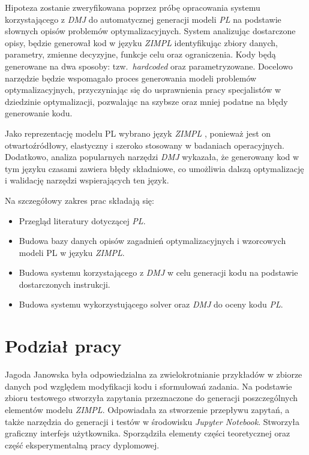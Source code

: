 Hipoteza zostanie zweryfikowana poprzez próbę opracowania systemu korzystającego z \textit{DMJ} do automatycznej generacji modeli \textit{PL} na podstawie słownych opisów problemów optymalizacyjnych. System analizując dostarczone opisy, będzie generował kod w języku \textit{ZIMPL} identyfikując zbiory danych, parametry, zmienne decyzyjne, funkcje celu oraz ograniczenia. Kody będą generowane na dwa sposoby: tzw.~\textit{hardcoded} oraz parametryzowane. Docelowo narzędzie będzie wspomagało proces generowania modeli problemów optymalizacyjnych, przyczyniając się do usprawnienia pracy specjalistów w dziedzinie optymalizacji, pozwalając na szybsze oraz mniej podatne na błędy generowanie kodu.

Jako reprezentację modelu PL wybrano język \textit{ZIMPL} \cite{zimpl_manual}, ponieważ jest on otwartoźródłowy, elastyczny i szeroko stosowany w badaniach operacyjnych. Dodatkowo, analiza popularnych narzędzi \textit{DMJ} wykazała, że generowany kod w tym języku czasami zawiera błędy składniowe, co umożliwia dalszą optymalizację i walidację narzędzi wspierających ten język.

Na szczegółowy zakres prac składają się:
\begin{itemize}
    \item Przegląd literatury dotyczącej \textit{PL}.
    \item Budowa bazy danych opisów zagadnień optymalizacyjnych i wzorcowych modeli PL w języku \textit{ZIMPL}.
    \item Budowa systemu korzystającego z \textit{DMJ} w celu generacji kodu na podstawie dostarczonych instrukcji.
    \item Budowa systemu wykorzystującego solver oraz \textit{DMJ} do oceny kodu \textit{PL}.
\end{itemize}



\section{Podział pracy}

Jagoda Janowska była odpowiedzialna za zwielokrotnianie przykładów w zbiorze danych pod względem modyfikacji kodu i sformułowań zadania. Na podstawie zbioru testowego stworzyła zapytania przeznaczone do generacji poszczególnych elementów modelu \textit{ZIMPL}. Odpowiadała za stworzenie przepływu zapytań, a także narzędzia do generacji i testów w środowisku \textit{Jupyter Notebook}. Stworzyła graficzny interfejs użytkownika. Sporządziła elementy części teoretycznej oraz część eksperymentalną pracy dyplomowej.

